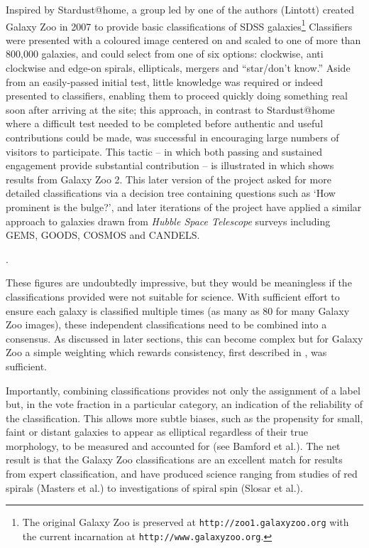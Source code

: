 \documentclass{ar2e}
\begin{document}
Inspired by Stardust@home, a group led by one of the authors (Lintott) created
Galaxy Zoo in 2007 to provide basic classifications of SDSS
galaxies\footnote{The original Galaxy Zoo is preserved at
\texttt{http://zoo1.galaxyzoo.org} with the current incarnation at
\texttt{http://www.galaxyzoo.org}.} Classifiers were presented with a coloured
image centered on and scaled to one of more than 800,000 galaxies, and could
select from one of six options: clockwise, anti clockwise and edge-on spirals,
ellipticals, mergers and ``star/don't know.'' Aside from  an easily-passed
initial test, little knowledge was required or indeed presented to classifiers,
enabling them to proceed quickly doing something real soon after arriving at the
site; this approach, in contrast to Stardust@home where a difficult test needed
to be completed before authentic and useful contributions could be made, was
successful in encouraging large numbers of visitors to participate. This tactic
-- in which both passing and sustained engagement provide substantial
contribution -- is illustrated in \Fref{}  which shows results from Galaxy Zoo
2. 
This later version of the project asked for more detailed
classifications via a decision tree containing questions such as `How prominent
is the bulge?', and later iterations of the project have applied a similar
approach to galaxies drawn from \emph{Hubble Space Telescope} surveys including
\textsc{GEMS, GOODS, COSMOS} and \textsc{CANDELS}. 

. 

These figures are undoubtedly impressive, but they would be meaningless if the
classifications provided were not suitable for science. With sufficient effort
to ensure each galaxy is classified multiple times (as many as 80 for many
Galaxy Zoo images), these independent classifications need to be combined into a
consensus. As discussed in later sections, this can become complex but for
Galaxy Zoo a simple weighting which rewards consistency, first described in
\citet{Land++}, was sufficient. 


Importantly, combining classifications provides not only the assignment of a
label but, in the vote fraction in a particular category, an indication of the
reliability of the classification. This allows more subtle biases, such as the
propensity for small, faint or distant galaxies to appear as elliptical
regardless of their true morphology, to be measured and accounted for (see
Bamford et al.). The net result is that the Galaxy Zoo classifications are an
excellent match for results from expert classification, and have produced
science ranging from studies of red spirals (Masters et al.) to investigations
of spiral spin (Slosar et al.).
\end{document}
